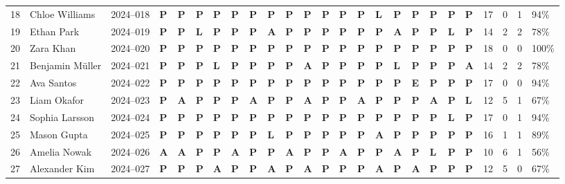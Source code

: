 \documentclass[12pt,landscape]{article}
\newcommand{\mkP}{\textcolor{green!50!black}{\textbf{P}}}
\newcommand{\mkA}{\textcolor{red!60!black}{\textbf{A}}}
\newcommand{\mkL}{\textcolor{orange!70!black}{\textbf{L}}}
\newcommand{\mkE}{\textcolor{secondary}{\textbf{E}}}
\begin{document}
\begin{longtable}{C{0.40cm} L{4.05cm} C{1.60cm} *{18}{C{0.78cm}} C{0.60cm} C{0.60cm} C{0.60cm} C{0.70cm}}
18 & Chloe Williams     & 2024--018 &
\mkP & \mkP & \mkP & \mkP & \mkP & \mkP &
\mkP & \mkP & \mkP & \mkP & \mkP & \mkP &
\mkL & \mkP & \mkP & \mkP & \mkP & \mkP &
17 & 0 & 1 & 94\% \\

19 & Ethan Park         & 2024--019 &
\mkP & \mkP & \mkL & \mkP & \mkP & \mkP &
\mkA & \mkP & \mkP & \mkP & \mkP & \mkP &
\mkP & \mkA & \mkP & \mkP & \mkL & \mkP &
14 & 2 & 2 & 78\% \\

20 & Zara Khan          & 2024--020 &
\mkP & \mkP & \mkP & \mkP & \mkP & \mkP &
\mkP & \mkP & \mkP & \mkP & \mkP & \mkP &
\mkP & \mkP & \mkP & \mkP & \mkP & \mkP &
18 & 0 & 0 & 100\% \\

21 & Benjamin M\"{u}ller & 2024--021 &
\mkP & \mkP & \mkP & \mkL & \mkP & \mkP &
\mkP & \mkP & \mkA & \mkP & \mkP & \mkP &
\mkP & \mkL & \mkP & \mkP & \mkP & \mkA &
14 & 2 & 2 & 78\% \\

22 & Ava Santos         & 2024--022 &
\mkP & \mkP & \mkP & \mkP & \mkP & \mkP &
\mkP & \mkP & \mkP & \mkP & \mkP & \mkP &
\mkP & \mkP & \mkE & \mkP & \mkP & \mkP &
17 & 0 & 0 & 94\% \\

23 & Liam Okafor        & 2024--023 &
\mkP & \mkA & \mkP & \mkP & \mkP & \mkA &
\mkP & \mkP & \mkA & \mkP & \mkP & \mkA &
\mkP & \mkP & \mkP & \mkA & \mkP & \mkL &
12 & 5 & 1 & 67\% \\

24 & Sophia Larsson     & 2024--024 &
\mkP & \mkP & \mkP & \mkP & \mkP & \mkP &
\mkP & \mkP & \mkP & \mkP & \mkP & \mkP &
\mkP & \mkP & \mkP & \mkP & \mkL & \mkP &
17 & 0 & 1 & 94\% \\

25 & Mason Gupta        & 2024--025 &
\mkP & \mkP & \mkP & \mkP & \mkP & \mkP &
\mkL & \mkP & \mkP & \mkP & \mkP & \mkP &
\mkA & \mkP & \mkP & \mkP & \mkP & \mkP &
16 & 1 & 1 & 89\% \\

26 & Amelia Nowak       & 2024--026 &
\mkA & \mkA & \mkP & \mkP & \mkA & \mkP &
\mkP & \mkA & \mkP & \mkP & \mkA & \mkP &
\mkP & \mkA & \mkP & \mkL & \mkP & \mkP &
10 & 6 & 1 & 56\% \\

27 & Alexander Kim      & 2024--027 &
\mkP & \mkP & \mkP & \mkA & \mkP & \mkP &
\mkA & \mkP & \mkA & \mkP & \mkP & \mkP &
\mkA & \mkP & \mkA & \mkP & \mkP & \mkP &
12 & 5 & 0 & 67\% \\


\end{longtable}
\end{document}
